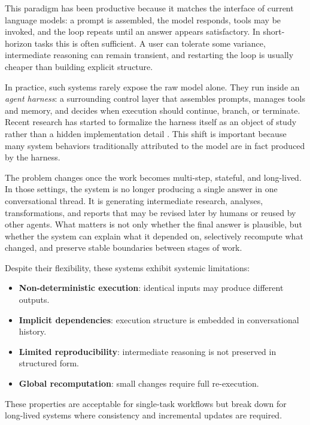 \documentclass{article}
\begin{document}
This paradigm has been productive because it matches the interface of current language models: a prompt is assembled, the model responds, tools may be invoked, and the loop repeats until an answer appears satisfactory. In short-horizon tasks this is often sufficient. A user can tolerate some variance, intermediate reasoning can remain transient, and restarting the loop is usually cheaper than building explicit structure.

In practice, such systems rarely expose the raw model alone. They run inside an \emph{agent harness}: a surrounding control layer that assembles prompts, manages tools and memory, and decides when execution should continue, branch, or terminate. Recent research has started to formalize the harness itself as an object of study rather than a hidden implementation detail \cite{pan2026nlah,zhang2025harness}. This shift is important because many system behaviors traditionally attributed to the model are in fact produced by the harness.

The problem changes once the work becomes multi-step, stateful, and long-lived. In those settings, the system is no longer producing a single answer in one conversational thread. It is generating intermediate research, analyses, transformations, and reports that may be revised later by humans or reused by other agents. What matters is not only whether the final answer is plausible, but whether the system can explain what it depended on, selectively recompute what changed, and preserve stable boundaries between stages of work.

Despite their flexibility, these systems exhibit systemic limitations:

\begin{itemize}
\item \textbf{Non-deterministic execution}: identical inputs may produce different outputs.
\item \textbf{Implicit dependencies}: execution structure is embedded in conversational history.
\item \textbf{Limited reproducibility}: intermediate reasoning is not preserved in structured form.
\item \textbf{Global recomputation}: small changes require full re-execution.
\end{itemize}

These properties are acceptable for single-task workflows but break down for long-lived systems where consistency and incremental updates are required.
\end{document}
